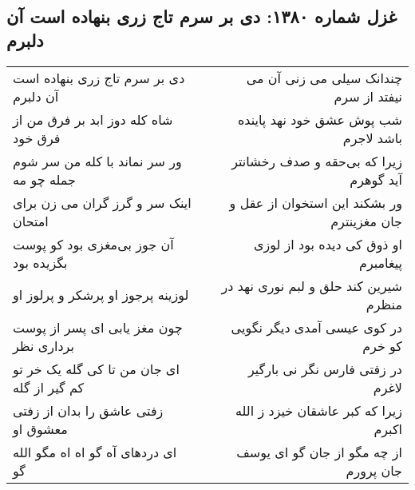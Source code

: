 \begin{center}
\section*{غزل شماره ۱۳۸۰: دی بر سرم تاج زری بنهاده است آن دلبرم}
\label{sec:1380}
\begin{longtable}{l p{0.5cm} r}
دی بر سرم تاج زری بنهاده است آن دلبرم
&&
چندانک سیلی می زنی آن می نیفتد از سرم
\\
شاه کله دوز ابد بر فرق من از فرق خود
&&
شب پوش عشق خود نهد پاینده باشد لاجرم
\\
ور سر نماند با کله من سر شوم جمله چو مه
&&
زیرا که بی‌حقه و صدف رخشانتر آید گوهرم
\\
اینک سر و گرز گران می زن برای امتحان
&&
ور بشکند این استخوان از عقل و جان مغزینترم
\\
آن جوز بی‌مغزی بود کو پوست بگزیده بود
&&
او ذوق کی دیده بود از لوزی پیغامبرم
\\
لوزینه پرجوز او پرشکر و پرلوز او
&&
شیرین کند حلق و لبم نوری نهد در منظرم
\\
چون مغز یابی ای پسر از پوست برداری نظر
&&
در کوی عیسی آمدی دیگر نگویی کو خرم
\\
ای جان من تا کی گله یک خر تو کم گیر از گله
&&
در زفتی فارس نگر نی بارگیر لاغرم
\\
زفتی عاشق را بدان از زفتی معشوق او
&&
زیرا که کبر عاشقان خیزد ز الله اکبرم
\\
ای دردهای آه گو اه اه مگو الله گو
&&
از چه مگو از جان گو ای یوسف جان پرورم
\\
\end{longtable}
\end{center}
